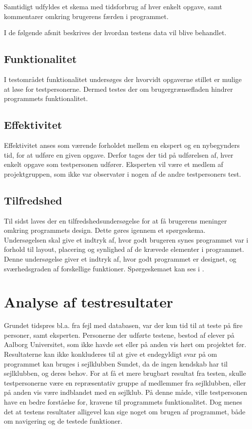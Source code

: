 Samtidigt udfyldes et skema med tidsforbrug af hver enkelt opgave, samt kommentarer omkring brugerens færden i programmet.

I de følgende afsnit beskrives der hvordan testens data vil blive behandlet.

\subsection{Funktionalitet}
I testområdet funktionalitet undersøges der hvorvidt opgaverne stillet er mulige at løse for testpersonerne.
Dermed testes der om brugergrænsefladen hindrer programmets funktionalitet. 

\subsection{Effektivitet}
Effektivitet anses som værende forholdet mellem en ekspert og en nybegynders tid, for at udføre en given opgave.\citep{UIEffeciency}
Derfor tages der tid på udførelsen af, hver enkelt opgave som testpersonen udfører.
Eksperten vil være et medlem af projektgruppen, som ikke var observatør i nogen af de andre testpersoners test. 

\subsection{Tilfredshed}
Til sidst laves der en tilfredshedsundersøgelse for at få brugerens meninger omkring programmets design. 
Dette gøres igennem et spørgeskema. 
Undersøgelsen skal give et indtryk af, hvor godt brugeren synes programmet var i forhold til layout, placering og synlighed af de krævede elementer i programmet. 
Denne undersøgelse giver et indtryk af, hvor godt programmet er designet, og sværhedsgraden af forskellige funktioner. 
Spørgeskemaet kan ses i . \citep{UISatisfaction}


\section{Analyse af testresultater}

Grundet tidspres bl.a. fra fejl med databasen, var der kun tid til at teste på fire personer, samt eksperten.
Personerne der udførte testene, bestod af elever på Aalborg Universitet, som ikke havde set eller på anden vis hørt om projektet før.
Resultaterne kan ikke konkluderes til at give et endegyldigt svar på om programmet kan bruges i sejlklubben Sundet, da de ingen kendskab har til sejlklubben, og deres behov.
For at få et mere brugbart resultat fra testen, skulle testpersonerne være en repræsentativ gruppe af medlemmer fra sejlklubben, eller på anden vis være indblandet med en sejlklub. 
På denne måde, ville testpersonen have en bedre forståelse for, kravene til programmets funktionalitet.
Dog menes det at testens resultater alligevel kan sige noget om brugen af programmet, både om navigering og de testede funktioner.

